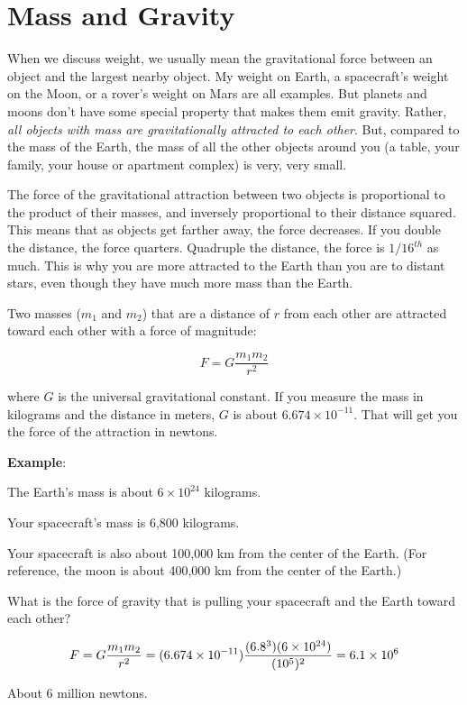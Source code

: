 \section{Mass and Gravity}
When we discuss weight, we usually mean the gravitational force between an object and the largest nearby object. My weight on Earth, a spacecraft's weight on the Moon, or a rover's weight on Mars are all examples. But planets and moons don't have some special property that makes them emit gravity. Rather, \textit{all objects with mass are gravitationally attracted to each other}. But, compared to the mass of the Earth, the mass of all the other objects around you (a table, your family, your house or apartment complex) is very, very small. 

The
force of the gravitational attraction between two objects is proportional to the product
of their masses, and inversely proportional to their distance squared.
This means that as objects get farther away, the force decreases. If you double the distance, the force quarters. Quadruple the distance, the force is $1/16^{th}$ as much. 
This is why you are more attracted to the Earth than you are to
distant stars, even though they have much more mass than the Earth.

\begin{mdframed}[style=important, frametitle={Newton's Law of Universal Gravitation}]

Two masses ($m_1$ and $m_2$) that are a distance of
$r$ from each other are attracted toward each other with a force of
magnitude:

$$F = G\frac{m_1 m_2}{r^2}$$

where $G$ is the universal gravitational constant. If you measure the
mass in kilograms and the distance in meters, $G$ is about $6.674
\times 10^{-11}$. That will get you the force of the attraction in
newtons.

\end{mdframed}

\textbf{Example}: %

\begin{Exercise}[title={Gravity}, label=gravity_earth]

  The Earth's mass is about $6 \times 10^{24}$ kilograms.

  Your spacecraft's mass is 6,800 kilograms.

  Your spacecraft is also about 100,000 km from the center of the Earth. (For 
  reference, the moon is about 400,000 km from the center of the Earth.)

  What is the force of gravity that is pulling your spacecraft and the Earth 
  toward each other?

\end{Exercise}
\begin{Answer}[ref=gravity_earth]

  $$F = G\frac{m_1 m_2}{r^2} = (6.674 \times 10^{-11})\frac{(6.8 \time 10^3)(6 
  \times 10^{24})}{(10^5)^2} = 6.1 \times 10^{6}$$

  About 6 million newtons.

\end{Answer}

